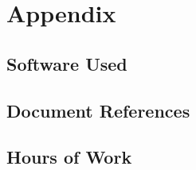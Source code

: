 \documentclass[../../dd.tex]{subfiles}
\begin{document}
	\chapter{Appendix}

		\section{Software Used}
		\section{Document References}
		\section{Hours of Work}
\end{document}
